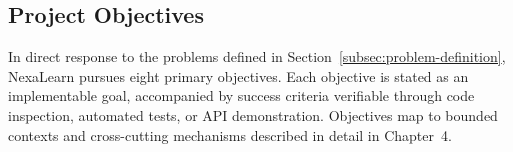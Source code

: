 
\subsection{Project Objectives}
\label{subsec:project-objectives}

In direct response to the problems defined in Section~\ref{subsec:problem-definition}, NexaLearn pursues eight primary objectives. Each objective is stated as an implementable goal, accompanied by success criteria verifiable through code inspection, automated tests, or API demonstration. Objectives map to bounded contexts and cross-cutting mechanisms described in detail in Chapter~4.

